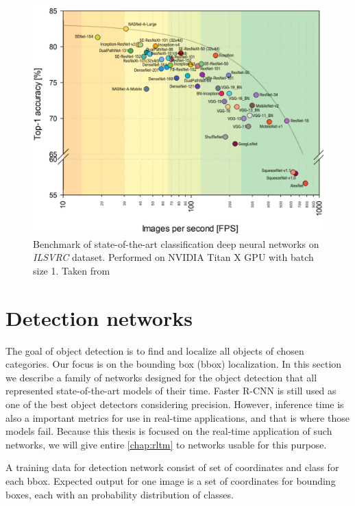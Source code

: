 \begin{figure}
    \includegraphics[width=\textwidth]{img/fps_comp}
    \caption{Benchmark of state-of-the-art classification deep neural networks on \textit{ILSVRC} dataset. Performed on NVIDIA
Titan X GPU with batch size 1. Taken from \cite[fig. 3]{bib:cnnbenchmark}}
    \label{fig:cnnbenchmark}
\end{figure}



\section{Detection networks}
\label{sec:detnets}
The goal of object detection is to find and localize all objects of chosen categories. Our focus is on the bounding box (bbox) localization. In this section we describe a family of networks designed for the object detection that all represented state-of-the-art models of their time. Faster R-CNN is still used as one of the best object detectors considering precision. However, inference time is also a important metrics for use in real-time applications, and that is where those models fail. Because this thesis is focused on the real-time application of such networks, we will give entire \cref{chap:rltm} to networks usable for this purpose. 

A training data for detection network consist of set of coordinates and class for each bbox. Expected output for one image is a set of coordinates for bounding boxes, each with an probability distribution of classes. 

